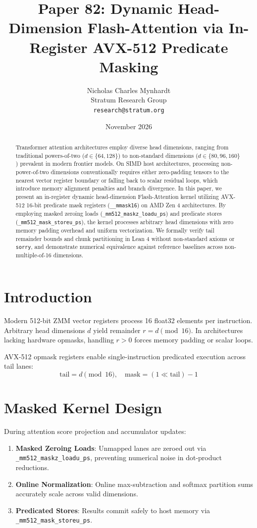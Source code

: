 \documentclass[10pt,twocolumn,letterpaper]{article}
\title{Paper 82: Dynamic Head-Dimension Flash-Attention via In-Register AVX-512 Predicate Masking}
\author{Nicholas Charles Mynhardt \\ Stratum Research Group \\ \texttt{research@stratum.org}}
\date{November 2026}
\begin{document}
\maketitle

\begin{abstract}
Transformer attention architectures employ diverse head dimensions, ranging from traditional powers-of-two ($d \in \{64, 128\}$) to non-standard dimensions ($d \in \{80, 96, 160\}$) prevalent in modern frontier models. On SIMD host architectures, processing non-power-of-two dimensions conventionally requires either zero-padding tensors to the nearest vector register boundary or falling back to scalar residual loops, which introduce memory alignment penalties and branch divergence. In this paper, we present an in-register dynamic head-dimension Flash-Attention kernel utilizing AVX-512 16-bit predicate mask registers (\texttt{\_\_mmask16}) on AMD Zen 4 architectures. By employing masked zeroing loads (\texttt{\_mm512\_maskz\_loadu\_ps}) and predicate stores (\texttt{\_mm512\_mask\_storeu\_ps}), the kernel processes arbitrary head dimensions with zero memory padding overhead and uniform vectorization. We formally verify tail remainder bounds and chunk partitioning in Lean 4 without non-standard axioms or \texttt{sorry}, and demonstrate numerical equivalence against reference baselines across non-multiple-of-16 dimensions.
\end{abstract}

\section{Introduction}
Modern 512-bit ZMM vector registers process 16 float32 elements per instruction. Arbitrary head dimensions $d$ yield remainder $r = d \pmod{16}$. In architectures lacking hardware opmasks, handling $r > 0$ forces memory padding or scalar loops.

AVX-512 opmask registers enable single-instruction predicated execution across tail lanes:
\begin{equation}
\text{tail} = d \pmod{16}, \quad \text{mask} = (1 \ll \text{tail}) - 1
\end{equation}

\section{Masked Kernel Design}
During attention score projection and accumulator updates:
\begin{enumerate}
    \item \textbf{Masked Zeroing Loads}: Unmapped lanes are zeroed out via \texttt{\_mm512\_maskz\_loadu\_ps}, preventing numerical noise in dot-product reductions.
    \item \textbf{Online Normalization}: Online max-subtraction and softmax partition sums accurately scale across valid dimensions.
    \item \textbf{Predicated Stores}: Results commit safely to host memory via \texttt{\_mm512\_mask\_storeu\_ps}.
\end{enumerate}
\end{document}
